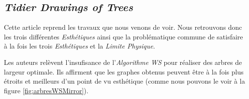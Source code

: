 \documentclass{article}
\begin{document}
\newpage
  \subsection{\emph{Tidier Drawings of Trees}}

  Cette article \cite{article81} reprend les travaux que nous venons de voir. Nous retrouvons donc les trois différentes \emph{Esthétiques} ainsi que la problématique commune de satisfaire à la fois les trois \emph{Esthétiques} et la \emph{Limite Physique}.

  Les auteurs relèvent l'insufisance de l'\emph{Algorithme WS} pour réaliser des arbres de largeur optimale. Ils affirment que les graphes obtenus peuvent être à la fois plus étroits et meilleurs d'un point de vu esthétique (comme nous pouvons le voir à la figure \ref{fig:arbresWSMirror}).
\end{document}
